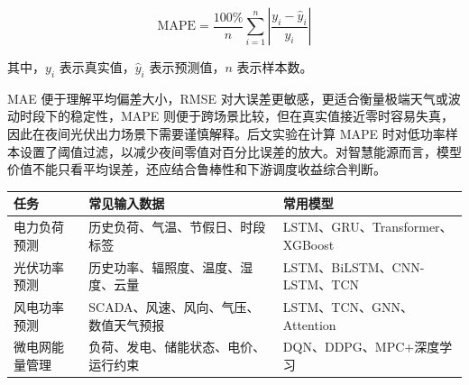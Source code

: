 \[
\mathrm{MAPE}=\frac{100\%}{n}\sum_{i=1}^{n}\left|\frac{y_i-\hat{y}_i}{y_i}\right|
\]

其中，$y_i$ 表示真实值，$\hat{y}_i$ 表示预测值，$n$ 表示样本数。

MAE 便于理解平均偏差大小，RMSE 对大误差更敏感，更适合衡量极端天气或波动时段下的稳定性，MAPE 则便于跨场景比较，但在真实值接近零时容易失真，因此在夜间光伏出力场景下需要谨慎解释。后文实验在计算 MAPE 时对低功率样本设置了阈值过滤，以减少夜间零值对百分比误差的放大。对智慧能源而言，模型价值不能只看平均误差，还应结合鲁棒性和下游调度收益综合判断。

\begin{center}
\vspace{3pt}
{\fontsize{8.6pt}{12pt}\selectfont
\setlength{\tabcolsep}{2pt}
\begin{tabular}{@{}p{}p{}p{}@{}}
\toprule
任务 & 常见输入数据 & 常用模型 \\
\midrule
电力负荷预测 & 历史负荷、气温、节假日、时段标签 & LSTM、GRU、Transformer、XGBoost \\
光伏功率预测 & 历史功率、辐照度、温度、湿度、云量 & LSTM、BiLSTM、CNN-LSTM、TCN \\
风电功率预测 & SCADA、风速、风向、气压、数值天气预报 & LSTM、TCN、GNN、Attention \\
微电网能量管理 & 负荷、发电、储能状态、电价、运行约束 & DQN、DDPG、MPC+深度学习 \\
\bottomrule
\end{tabular}}
\label{tab:tasks-models}
\end{center}
